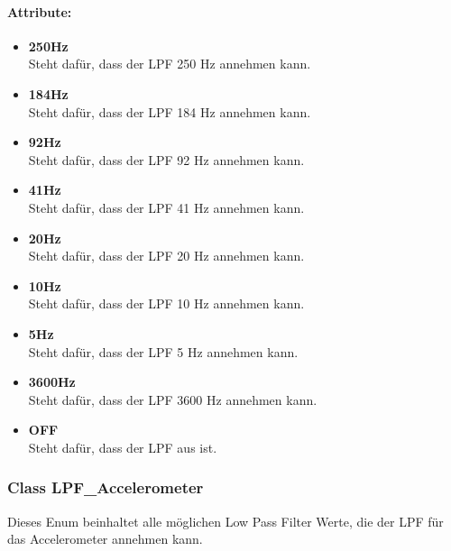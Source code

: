 \documentclass[a4paper,12pt]{article}
\begin{document}
\paragraph{Attribute:}
\begin{itemize}
	\item \textbf{250Hz}\\Steht dafür, dass der LPF 250 Hz annehmen kann.
	\item \textbf{184Hz}\\Steht dafür, dass der LPF 184 Hz annehmen kann.
	\item \textbf{92Hz}\\Steht dafür, dass der LPF 92 Hz annehmen kann.
	\item \textbf{41Hz}\\Steht dafür, dass der LPF 41 Hz annehmen kann.
	\item \textbf{20Hz}\\Steht dafür, dass der LPF 20 Hz annehmen kann.
	\item \textbf{10Hz}\\Steht dafür, dass der LPF 10 Hz annehmen kann.
	\item \textbf{5Hz}\\Steht dafür, dass der LPF 5 Hz annehmen kann.
	\item \textbf{3600Hz}\\Steht dafür, dass der LPF 3600 Hz annehmen kann.
	\item \textbf{OFF}\\Steht dafür, dass der LPF aus ist.
\end{itemize}


\subsubsection{Class LPF\_Accelerometer}
Dieses Enum beinhaltet alle möglichen Low Pass Filter Werte, die der LPF für das Accelerometer annehmen kann.
\end{document}
